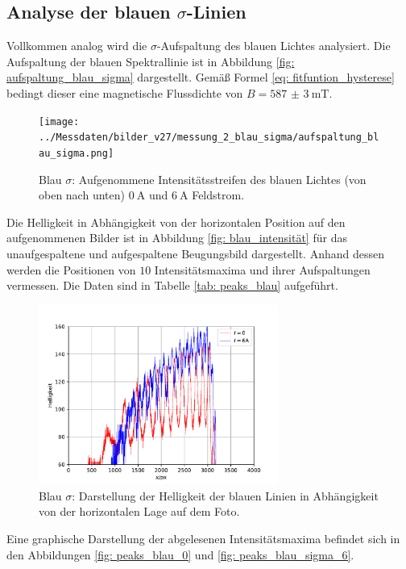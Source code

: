 \subsection{Analyse der blauen $\sigma$-Linien}
Vollkommen analog wird die $\sigma$-Aufspaltung des blauen Lichtes analysiert.
Die Aufspaltung der blauen Spektrallinie ist in Abbildung \ref{fig: aufspaltung_blau_sigma} dargestellt.
Gemäß Formel \eqref{eq: fitfuntion_hysterese}
bedingt dieser eine magnetische Flussdichte von $B = \SI{587(3)}{\milli\tesla}$.
\begin{figure}
  \centering
  \texttt{[image: ../Messdaten/bilder\_v27/messung\_2\_blau\_sigma/aufspaltung\_blau\_sigma.png]}
  \caption{Blau $\sigma$: Aufgenommene Intensitätsstreifen des blauen Lichtes (von oben nach unten) $\SI{0}{\ampere}$ und $\SI{6}{\ampere}$ Feldstrom.}
  \label{fig: aufspaltung_blau}
\end{figure}
Die Helligkeit in Abhängigkeit von der horizontalen Position auf den aufgenommenen Bilder ist in Abbildung \ref{fig: blau_intensität} für das unaufgespaltene
und aufgespaltene Beugungsbild dargestellt. Anhand dessen werden die Positionen von $10$ Intensitätsmaxima und ihrer Aufspaltungen
vermessen. Die Daten sind in Tabelle \ref{tab: peaks_blau} aufgeführt.
\begin{figure}
  \centering
  \includegraphics[width = 0.7\textwidth]{../Messdaten/plots/blau_sigma_intensitaet.pdf}
  \caption{Blau $\sigma$: Darstellung der Helligkeit der blauen Linien in Abhängigkeit von der horizontalen Lage auf dem Foto.}
  \label{fig: blau_intensität_sigma}
\end{figure}

Eine graphische Darstellung der abgelesenen Intensitätsmaxima befindet sich in den Abbildungen \ref{fig: peaks_blau_0} und \ref{fig: peaks_blau_sigma_6}.
